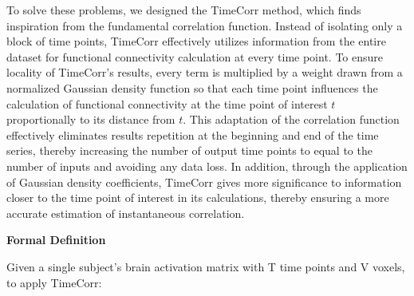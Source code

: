 \documentclass[11pt]{article}
\begin{document}
To solve these problems, we designed the TimeCorr method, which finds inspiration from the fundamental correlation function. Instead of isolating only a block of time points, TimeCorr effectively utilizes information from the entire dataset for functional connectivity calculation at every time point. To ensure locality of TimeCorr's results, every term is multiplied by a weight drawn from a normalized Gaussian density function so that each time point influences the calculation of functional connectivity at the time point of interest $t$ proportionally to its distance from $t$. This adaptation of the correlation function effectively eliminates results repetition at the beginning and end of the time series, thereby increasing the number of output time points to equal to the number of inputs and avoiding any data loss. In addition, through the application of Gaussian density coefficients, TimeCorr gives more significance to information closer to the time point of interest in its calculations, thereby ensuring a more accurate estimation of instantaneous correlation.

\large{\textbf{Formal Definition}}

\normalsize
Given a single subject's brain activation matrix with T time points and V voxels, to apply TimeCorr:
\end{document}
